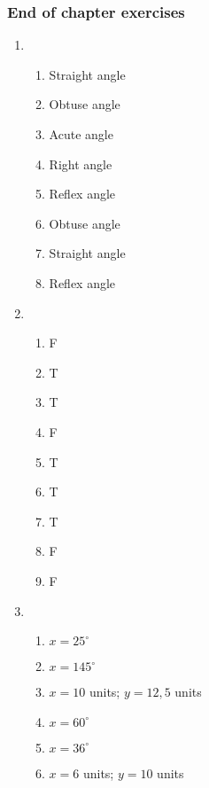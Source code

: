 {\begin{multicols}{3}
\subsubsection*{End of chapter exercises} %
\begin{enumerate}[noitemsep, label=\textbf{\arabic*}.]
      \item %
	  \begin{enumerate}[noitemsep, label=\textbf{(\alph*)} ]
		\item Straight angle
\item Obtuse angle
\item Acute angle
\item Right angle
\item Reflex angle
\item Obtuse angle
\item Straight angle
\item Reflex angle
	  \end{enumerate}

      \item %
      \begin{enumerate}[noitemsep, label=\textbf{(\alph*)} ]

\item F%
\item T%
\item T%
\item F%
\item T%
\item T%
\item T%
\item F%
\item F%
	  \end{enumerate}
      \item %
	  \begin{enumerate}[noitemsep, label=\textbf{(\alph*)} ]
	\item $x=25^{\circ}$
\item $x=145^{\circ}$
\item $x=10$ units; $y=12,5$ units
\item $x=60^{\circ}$
\item $x=36^{\circ}$
\item $x=6$ units; $y=10$ units
	  \end{enumerate}


\end{enumerate}
\end{multicols}}
